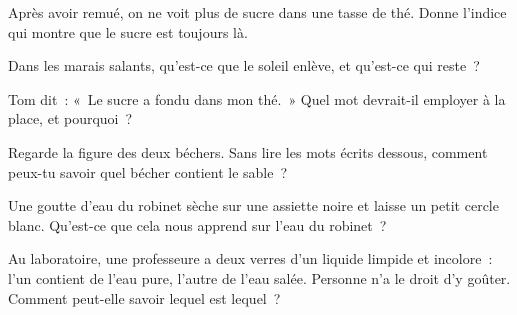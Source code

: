 \begin{exercise}[$\star$]\label{exo:g2:mixing-and-dissolving:6}
Après avoir remué, on ne voit plus de sucre dans une tasse de thé.
Donne l'indice qui montre que le sucre est toujours là.
\end{exercise}

\begin{exercise}[$\star$]\label{exo:g2:mixing-and-dissolving:7}
Dans les marais salants, qu'est-ce que le soleil enlève, et qu'est-ce
qui reste~?
\end{exercise}

\begin{exercise}[$\star$]\label{exo:g2:mixing-and-dissolving:8}
Tom dit~: «~Le sucre a fondu dans mon thé.~» Quel mot devrait-il
employer à la place, et pourquoi~?
\end{exercise}

\begin{exercise}[$\star\star$]\label{exo:g2:mixing-and-dissolving:9}
Regarde la figure des deux béchers. Sans lire les mots écrits dessous,
comment peux-tu savoir quel bécher contient le sable~?
\end{exercise}

\begin{exercise}[$\star\star$]\label{exo:g2:mixing-and-dissolving:10}
Une goutte d'eau du robinet sèche sur une assiette noire et laisse un
petit cercle blanc. Qu'est-ce que cela nous apprend sur l'eau du
robinet~?
\end{exercise}

\begin{exercise}[$\star\star$]\label{exo:g2:mixing-and-dissolving:11}
Au laboratoire, une professeure a deux verres d'un liquide limpide et
incolore~: l'un contient de l'eau pure, l'autre de l'eau salée.
Personne n'a le droit d'y goûter. Comment peut-elle savoir lequel est
lequel~?
\end{exercise}
